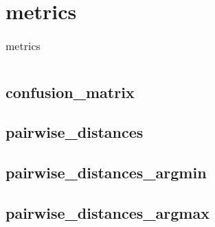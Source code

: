\chapter{metrics\label{metrics}}
\begin{table}
    \centering
    \caption{metrics}
    \begin{tabular}{llll}
        \hline
        \nameref{confusionmatrix} & \nameref{pairwisedistances} & \nameref{pairwisedistancesargmin} & \nameref{pairwisedistancesargmax} \\
        \hline
    \end{tabular}
\end{table}
\section{confusion\_matrix\label{confusionmatrix}}
\section{pairwise\_distances\label{pairwisedistances}}
\section{pairwise\_distances\_argmin\label{pairwisedistancesargmin}}
\section{pairwise\_distances\_argmax\label{pairwisedistancesargmax}}